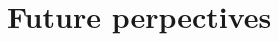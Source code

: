\documentclass{article}
\begin{document}

\section{Future perpectives}

\newcommand{\urlprefix}[0]{}  %



\end{document}

